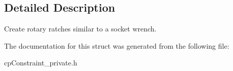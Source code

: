 \subsection{Detailed Description}
Create rotary ratches similar to a socket wrench. 

The documentation for this struct was generated from the following file\+:\begin{DoxyCompactItemize}
\item 
cp\+Constraint\+\_\+private.\+h\end{DoxyCompactItemize}
